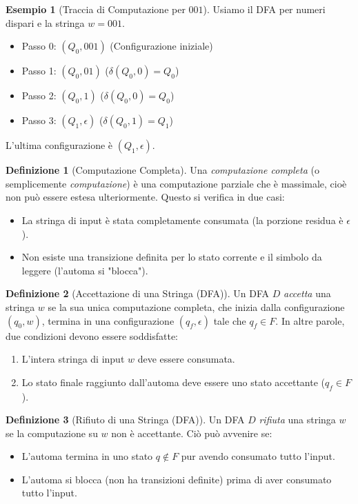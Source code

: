 \documentclass[a4paper]{article}
\theoremstyle{definition} %
\newtheorem{definition}{Definizione}[section]
\newtheorem{example}{Esempio}[section]
\begin{document}
\begin{example}[Traccia di Computazione per $001$]
Usiamo il DFA per numeri dispari e la stringa $w = 001$.
\begin{itemize}
    \item Passo 0: $(Q_0, 001)$ \quad (Configurazione iniziale)
    \item Passo 1: $(Q_0, 01)$ \quad ($\delta(Q_0, 0) = Q_0$)
    \item Passo 2: $(Q_0, 1)$ \quad ($\delta(Q_0, 0) = Q_0$)
    \item Passo 3: $(Q_1, \epsilon)$ \quad ($\delta(Q_0, 1) = Q_1$)
\end{itemize}
L'ultima configurazione è $(Q_1, \epsilon)$.
\end{example}

\begin{definition}[Computazione Completa]
Una \emph{computazione completa} (o semplicemente \emph{computazione}) è una computazione parziale che è massimale, cioè non può essere estesa ulteriormente. Questo si verifica in due casi:
\begin{itemize}
    \item La stringa di input è stata completamente consumata (la porzione residua è $\epsilon$).
    \item Non esiste una transizione definita per lo stato corrente e il simbolo da leggere (l'automa si "blocca").
\end{itemize}
\end{definition}

\begin{definition}[Accettazione di una Stringa (DFA)]
Un DFA $D$ \emph{accetta} una stringa $w$ se la sua unica computazione completa, che inizia dalla configurazione $(q_0, w)$, termina in una configurazione $(q_f, \epsilon)$ tale che $q_f \in F$.
In altre parole, due condizioni devono essere soddisfatte:
\begin{enumerate}
    \item L'intera stringa di input $w$ deve essere consumata.
    \item Lo stato finale raggiunto dall'automa deve essere uno stato accettante ($q_f \in F$).
\end{enumerate}
\end{definition}

\begin{definition}[Rifiuto di una Stringa (DFA)]
Un DFA $D$ \emph{rifiuta} una stringa $w$ se la computazione su $w$ non è accettante. Ciò può avvenire se:
\begin{itemize}
    \item L'automa termina in uno stato $q \notin F$ pur avendo consumato tutto l'input.
    \item L'automa si blocca (non ha transizioni definite) prima di aver consumato tutto l'input.
\end{itemize}
\end{definition}
\end{document}
